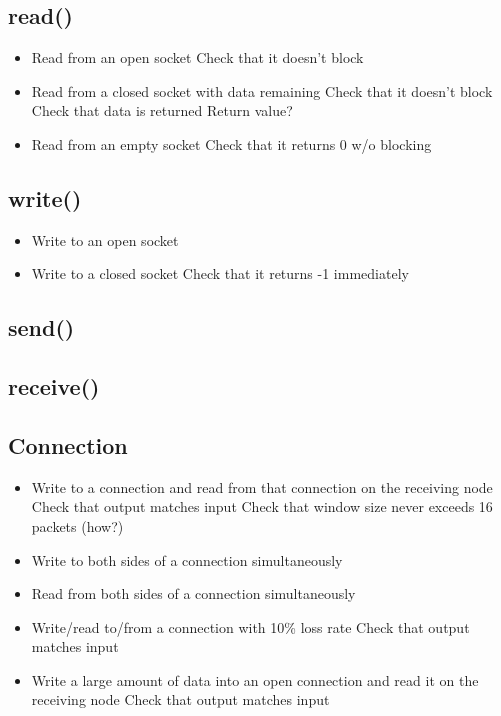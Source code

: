 \documentclass[]{article}
\begin{document}
\subsection{read()}
\begin{itemize}
	\item Read from an open socket
	\subitem Check that it doesn't block
	\item Read from a closed socket with data remaining
	\subitem Check that it doesn't block
	\subitem Check that data is returned
	\subitem Return value?
	\item Read from an empty socket
	\subitem Check that it returns 0 w/o blocking
\end{itemize}
\subsection{write()}
\begin{itemize}
	\item Write to an open socket
	\item Write to a closed socket
	\subitem Check that it returns -1 immediately
\end{itemize}
\subsection{send()}
\subsection{receive()}
\subsection{Connection}
\begin{itemize}
	\item Write to a connection and read from that connection on the receiving node
	\subitem Check that output matches input
	\subitem Check that window size never exceeds 16 packets (how?)
	\item Write to both sides of a connection simultaneously
	\item Read from both sides of a connection simultaneously
	\item Write/read to/from a connection with 10\% loss rate
	\subitem Check that output matches input
	\item Write a large amount of data into an open connection and read it on the receiving node
	\subitem Check that output matches input
\end{itemize}
\end{document}
